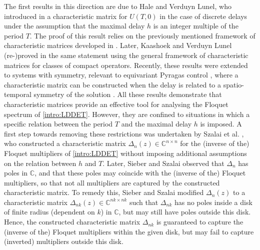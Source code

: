 \documentclass[english]{myarticle}
\begin{document}
\begin{sloppypar}
The first results in this direction are due to Hale and Verduyn Lunel, who introduced in \cite{Hale1993} a characteristic matrix for $U(T,0)$ in the case of discrete delays under the assumption that the maximal delay $h$ is an integer multiple of the period $T$. The proof of this result relies on the previously mentioned framework of characteristic matrices developed in \cite{Kaashoek1992}. Later, Kaashoek and Verduyn Lunel (re-)proved in \cite{Kaashoek2022} the same statement using the general framework of characteristic matrices for classes of compact operators. Recently, these results were extended to systems with symmetry, relevant to equivariant Pyragas control \cite{Pyragas1992}, where a characteristic matrix can be constructed when the delay is related to a spatio-temporal symmetry of the solution \cite{Wolff2022a}. All these results demonstrate that characteristic matrices provide an effective tool for analysing the Floquet spectrum of \eqref{intro:LDDET}. However, they are confined to situations in which a specific relation between the period $T$ and the maximal delay $h$ is imposed. A first step towards removing these restrictions was undertaken by Szalai et al. \cite{Szalai2006}, who constructed a characteristic matrix $\Delta_n(z) \in \mathbb{C}^{n \times n}$ for the (inverse of the) Floquet multipliers of \eqref{intro:LDDET} without imposing additional assumptions on the relation between $h$ and $T$. Later, Sieber and Szalai \cite{Sieber2011} observed that $\Delta_n$ has poles in $\mathbb{C}$, and that these poles may coincide with the (inverse of the) Floquet multipliers, so that not all multipliers are captured by the constructed characteristic matrix. To remedy this, Sieber and Szalai modified $\Delta_n(z)$ to a characteristic matrix $\Delta_{nk}(z) \in \mathbb{C}^{nk \times nk}$ such that $\Delta_{nk}$ has no poles inside a disk of finite radius (dependent on $k$) in $\mathbb{C}$, but may still have poles outside this disk. Hence, the constructed characteristic matrix $\Delta_{nk}$ is guaranteed to capture the (inverse of the) Floquet multipliers within the given disk, but may fail to capture (inverted) multipliers outside this disk.


\end{sloppypar}
\end{document}
